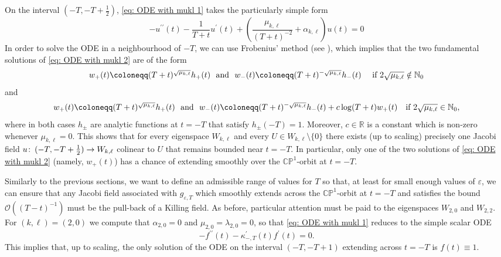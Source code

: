 \documentclass{article}
\numberwithin{equation}{section}        %
\theoremstyle{bfnote}
\theoremstyle{definition}
\theoremstyle{bfremark}
\newcommand{\col}{\colon \thinspace}        %
\begin{document}
On the interval $(-T,-T+\frac{1}{2})$, \eqref{eq: ODE with mukl 1} takes the particularly simple form
\begin{equation}       \label{eq: ODE with mukl 2}
    - u^{\prime\prime}(t) - \frac{1}{T+t} u^\prime(t) + \left(\frac{\mu_{k,\ell}}{(T+t)^{-2}} + \alpha_{k,\ell} \right) u(t) = 0 
\end{equation}
In order to solve the ODE in a neighbourhood of $-T$, we can use Frobenius' method (see \cite[Section~4.2]{Teschl2012ODE_and_DynSystems}), which implies that the two fundamental solutions of \eqref{eq: ODE with mukl 2} are of the form 
\begin{align*}
    w_+(t) \coloneqq (T+t)^{\sqrt{\mu_{k,\ell}}} h_+(t) ~~ \textup{and} ~~ w_-(t) \coloneqq (T+t)^{-\sqrt{\mu_{k,\ell}}} h_-(t) ~~~~ \textup{if $2\sqrt{\mu_{k,\ell}} \notin \mathbb{N}_0$}
\end{align*}
and 
\begin{align*}
    w_+(t) \coloneqq (T+t)^{\sqrt{\mu_{k,\ell}}} h_+(t) ~~ \textup{and} ~~ w_-(t) \coloneqq (T+t)^{-\sqrt{\mu_{k,\ell}}} h_-(t) + c \log(T+t) w_+(t) ~~~ \textup{if $2\sqrt{\mu_{k,\ell}} \in \mathbb{N}_0$,}
\end{align*}
where in both cases $h_{\pm}$ are analytic functions at $t=-T$ that satisfy $h_{\pm}(-T)=1$. Moreover, $c\in \mathbb{R}$ is a constant which is non-zero whenever $\mu_{k,\ell} = 0$. This shows that for every eigenspace $W_{k,\ell}$ and every $U \in W_{k,\ell} \setminus \{0\}$ there exists (up to scaling) precisely one Jacobi field $u \col (-T,-T+\frac{1}{2}) \to W_{k,\ell}$ colinear to $U$ that remains bounded near $t=-T$. In particular, only one of the two solutions of \eqref{eq: ODE with mukl 2} (namely, $w_+(t)$) has a chance of extending smoothly over the $\mathbb{CP}^1$-orbit at $t=-T$.

Similarly to the previous sections, we want to define an admissible range of values for $T$ so that, at least for small enough values of $\varepsilon$, we can ensure that any Jacobi field associated with $g_{\varepsilon,T}$ which smoothly extends across the $\mathbb{CP}^1$-orbit at $t = -T$ and satisfies the bound $\mathcal{O}((T-t)^{-1})$ must be the pull-back of a Killing field. As before, particular attention must be paid to the eigenspaces $W_{2,0}$ and $W_{2,2}$. For $(k,\ell) = (2,0)$ we compute that $\alpha_{2,0} = 0$ and $\mu_{2,0} = \lambda_{2,0} = 0$, so that \eqref{eq: ODE with mukl 1} reduces to the simple scalar ODE
\begin{equation}
    - f^{\prime\prime}(t) - \kappa^\prime_{-,T}(t) f^\prime(t) = 0 .
\end{equation}
This implies that, up to scaling, the only solution of the ODE on the interval $(-T,-T+1)$ extending across $t = -T$ is $f(t) \equiv 1$.
\end{document}

